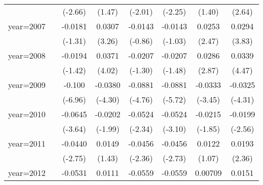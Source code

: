 \begin{table}[htbp]
\begin{tabular}{l*{7}{c}}
                    &                     &     (-2.66)         &      (1.47)         &     (-2.01)         &     (-2.25)         &      (1.40)         &      (2.64)         \\
\addlinespace
year=2007           &                     &     -0.0181         &      0.0307\sym{**} &     -0.0143         &     -0.0143         &      0.0253\sym{*}  &      0.0294\sym{***}\\
                    &                     &     (-1.31)         &      (3.26)         &     (-0.86)         &     (-1.03)         &      (2.47)         &      (3.83)         \\
\addlinespace
year=2008           &                     &     -0.0194         &      0.0371\sym{***}&     -0.0207         &     -0.0207         &      0.0286\sym{**} &      0.0339\sym{***}\\
                    &                     &     (-1.42)         &      (4.02)         &     (-1.30)         &     (-1.48)         &      (2.87)         &      (4.47)         \\
\addlinespace
year=2009           &                     &      -0.100\sym{***}&     -0.0380\sym{***}&     -0.0881\sym{***}&     -0.0881\sym{***}&     -0.0333\sym{***}&     -0.0325\sym{***}\\
                    &                     &     (-6.96)         &     (-4.30)         &     (-4.76)         &     (-5.72)         &     (-3.45)         &     (-4.31)         \\
\addlinespace
year=2010           &                     &     -0.0645\sym{***}&     -0.0202\sym{*}  &     -0.0524\sym{*}  &     -0.0524\sym{**} &     -0.0215         &     -0.0199\sym{*}  \\
                    &                     &     (-3.64)         &     (-1.99)         &     (-2.34)         &     (-3.10)         &     (-1.85)         &     (-2.56)         \\
\addlinespace
year=2011           &                     &     -0.0440\sym{**} &      0.0149         &     -0.0456\sym{*}  &     -0.0456\sym{**} &      0.0122         &      0.0193\sym{*}  \\
                    &                     &     (-2.75)         &      (1.43)         &     (-2.36)         &     (-2.73)         &      (1.07)         &      (2.36)         \\
\addlinespace
year=2012           &                     &     -0.0531\sym{**} &      0.0111         &     -0.0559\sym{**} &     -0.0559\sym{**} &     0.00709         &      0.0151         \\

\end{tabular}
\end{table}
